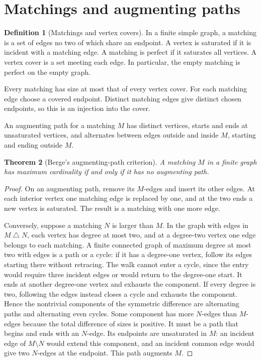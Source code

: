 \documentclass[11pt,oneside,openany]{book}
\theoremstyle{plain}
\newtheorem{theorem}{Theorem}[chapter]
\theoremstyle{definition}
\newtheorem{definition}[theorem]{Definition}
\theoremstyle{remark}
\begin{document}
\section{Matchings and augmenting paths}

\begin{definition}[Matchings and vertex covers]\label{p204:W49}
In a finite simple graph, a matching is a set of edges no two of
which share an endpoint. A vertex is saturated if it is incident
with a matching edge. A matching is perfect if it saturates all
vertices. A vertex cover is a set meeting each edge. In particular,
the empty matching is perfect on the empty graph.
\end{definition}

Every matching has size at most that of every vertex cover.
For each matching edge choose a covered endpoint. Distinct
matching edges give distinct chosen endpoints, so this is an
injection into the cover.

An augmenting path for a matching \(M\) has distinct vertices,
starts and ends at unsaturated vertices, and alternates between
edges outside and inside \(M\), starting and ending outside \(M\).

\begin{theorem}[Berge's augmenting-path criterion]\label{p204:W50}
A matching \(M\) in a finite graph has maximum cardinality if and
only if it has no augmenting path.
\end{theorem}

\begin{proof}
On an augmenting path, remove its \(M\)-edges and insert its other
edges. At each interior vertex one matching edge is replaced by
one, and at the two ends a new vertex is saturated. The result is
a matching with one more edge.

Conversely, suppose a matching \(N\) is larger than \(M\). In the
graph with edges in \(M\mathbin{\triangle}N\), each vertex has
degree at most two, and at a degree-two vertex one edge belongs
to each matching. A finite connected graph of maximum degree at
most two with edges is a path or a cycle: if it has a degree-one
vertex, follow its edges starting there without retracing. The
walk cannot enter a cycle, since the entry would require three
incident edges or would return to the degree-one start. It
ends at another degree-one vertex and exhausts the component.
If every degree is two, following the edges instead closes a cycle
and exhausts the component. Hence the nontrivial components of
the symmetric difference are alternating paths and alternating
even cycles. Some component has more \(N\)-edges than \(M\)-edges
because the total difference of sizes is positive. It must be
a path that begins and ends with an \(N\)-edge. Its endpoints
are unsaturated in \(M\): an incident edge of \(M\setminus N\)
would extend this component, and an incident common edge would
give two \(N\)-edges at the endpoint. This path augments \(M\).
\end{proof}
\end{document}
